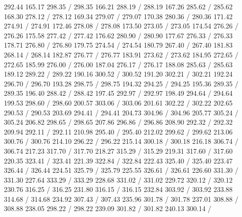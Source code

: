 { 292.44 165.17 298.35 /
 298.35 166.21 288.19 /
 288.19 167.26 285.62 /
 285.62 168.30 278.12 /
 278.12 169.34 279.07 /
 279.07 170.38 280.36 /
 280.36 171.42 274.91 /
 274.91 172.46 278.08 /
 278.08 173.50 273.05 /
 273.05 174.54 276.26 /
 276.26 175.58 277.42 /
 277.42 176.62 280.90 /
 280.90 177.67 276.33 /
 276.33 178.71 276.80 /
 276.80 179.75 274.54 /
 274.54 180.79 267.40 /
 267.40 181.83 268.14 /
 268.14 182.87 276.77 /
 276.77 183.91 273.62 /
 273.62 184.95 272.65 /
 272.65 185.99 276.00 /
 276.00 187.04 276.17 /
 276.17 188.08 285.63 /
 285.63 189.12 289.22 /
 289.22 190.16 300.52 /
 300.52 191.20 302.21 /
 302.21 192.24 296.70 /
 296.70 193.28 298.75 /
 298.75 194.32 294.25 /
 294.25 195.36 289.35 /
 289.35 196.40 288.42 /
 288.42 197.45 292.97 /
 292.97 198.49 294.64 /
 294.64 199.53 298.60 /
 298.60 200.57 303.06 /
 303.06 201.61 302.22 /
 302.22 202.65 290.53 /
 290.53 203.69 294.41 /
 294.41 204.73 304.96 /
 304.96 205.77 305.24 /
 305.24 206.82 298.65 /
 298.65 207.86 296.86 /
 296.86 208.90 292.32 /
 292.32 209.94 292.11 /
 292.11 210.98 295.40 /
 295.40 212.02 299.62 /
 299.62 213.06 300.76 /
 300.76 214.10 296.22 /
 296.22 215.14 300.18 /
 300.18 216.18 306.74 /
 306.74 217.23 317.70 /
 317.70 218.27 315.29 /
 315.29 219.31 317.60 /
 317.60 220.35 323.41 /
 323.41 221.39 322.84 /
 322.84 222.43 325.40 /
 325.40 223.47 326.44 /
 326.44 224.51 325.79 /
 325.79 225.55 326.61 /
 326.61 226.60 331.30 /
 331.30 227.64 333.29 /
 333.29 228.68 331.02 /
 331.02 229.72 320.12 /
 320.12 230.76 316.25 /
 316.25 231.80 316.15 /
 316.15 232.84 303.92 /
 303.92 233.88 314.68 /
 314.68 234.92 307.43 /
 307.43 235.96 301.78 /
 301.78 237.01 308.88 /
 308.88 238.05 298.22 /
 298.22 239.09 301.82 /
 301.82 240.13 300.14 /
}
